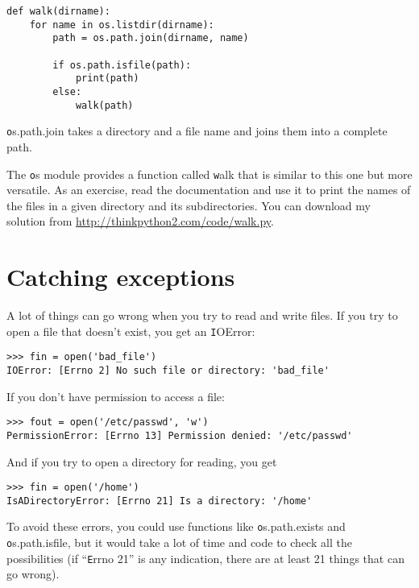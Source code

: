 \documentclass[
DIV=11,
fontsize=13,
twoside,
headinclude=false,
titlepage=firstiscover,
abstract=true,
headsepline=true,
footsepline=true,
chapterprefix=true, %
headings=big,
bibliography=totoc,%
captions=tableheading
]{scrbook}
\theoremstyle{definition}
\begin{document}
\begin{lstlisting}
def walk(dirname):
    for name in os.listdir(dirname):
        path = os.path.join(dirname, name)

        if os.path.isfile(path):
            print(path)
        else:
            walk(path)
\end{lstlisting}
%
{\texttt os.path.join} takes a directory and a file name and joins
them into a complete path.  

The {\texttt os} module provides a function called {\texttt walk} that is
similar to this one but more versatile.  As an exercise, read the
documentation and use it to print the names of the files in a given
directory and its subdirectories.  You can download my solution from
\url{http://thinkpython2.com/code/walk.py}.


\section{Catching exceptions}
\label{catch}

A lot of things can go wrong when you try to read and write
files.  If you try to open a file that doesn't exist, you get an
{\texttt IOError}:

\begin{lstlisting}
>>> fin = open('bad_file')
IOError: [Errno 2] No such file or directory: 'bad_file'
\end{lstlisting}
%
If you don't have permission to access a file:

\begin{lstlisting}
>>> fout = open('/etc/passwd', 'w')
PermissionError: [Errno 13] Permission denied: '/etc/passwd'
\end{lstlisting}
%
And if you try to open a directory for reading, you get

\begin{lstlisting}
>>> fin = open('/home')
IsADirectoryError: [Errno 21] Is a directory: '/home'
\end{lstlisting}
%
To avoid these errors, you could use functions like {\texttt os.path.exists}
and {\texttt os.path.isfile}, but it would take a lot of time and code
to check all the possibilities (if ``{\texttt Errno 21}'' is any
indication, there are at least 21 things that can go wrong).
\end{document}
